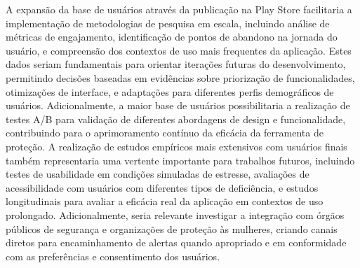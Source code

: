 A expansão da base de usuários através da publicação na Play Store facilitaria a implementação de metodologias de pesquisa em escala, incluindo análise de métricas de engajamento, identificação de pontos de abandono na jornada do usuário, e compreensão dos contextos de uso mais frequentes da aplicação. Estes dados seriam fundamentais para orientar iterações futuras do desenvolvimento, permitindo decisões baseadas em evidências sobre priorização de funcionalidades, otimizações de interface, e adaptações para diferentes perfis demográficos de usuários. Adicionalmente, a maior base de usuários possibilitaria a realização de testes A/B para validação de diferentes abordagens de design e funcionalidade, contribuindo para o aprimoramento contínuo da eficácia da ferramenta de proteção.
A realização de estudos empíricos mais extensivos com usuários finais também representaria uma vertente importante para trabalhos futuros, incluindo testes de usabilidade em condições simuladas de estresse, avaliações de acessibilidade com usuários com diferentes tipos de deficiência, e estudos longitudinais para avaliar a eficácia real da aplicação em contextos de uso prolongado. Adicionalmente, seria relevante investigar a integração com órgãos públicos de segurança e organizações de proteção às mulheres, criando canais diretos para encaminhamento de alertas quando apropriado e em conformidade com as preferências e consentimento dos usuários.
\begin{comment}
A realização de estudos empíricos mais extensivos com usuários finais também representaria uma vertente importante para trabalhos futuros, incluindo testes de usabilidade em condições simuladas de estresse, avaliações de acessibilidade com usuários com diferentes tipos de deficiência, e estudos longitudinais para avaliar a eficácia real da aplicação em contextos de uso prolongado. Adicionalmente, seria relevante investigar a integração com órgãos públicos de segurança e organizações de proteção às mulheres, criando canais diretos para encaminhamento de alertas quando apropriado e em conformidade com as preferências e consentimento dos usuários.
\end{comment}